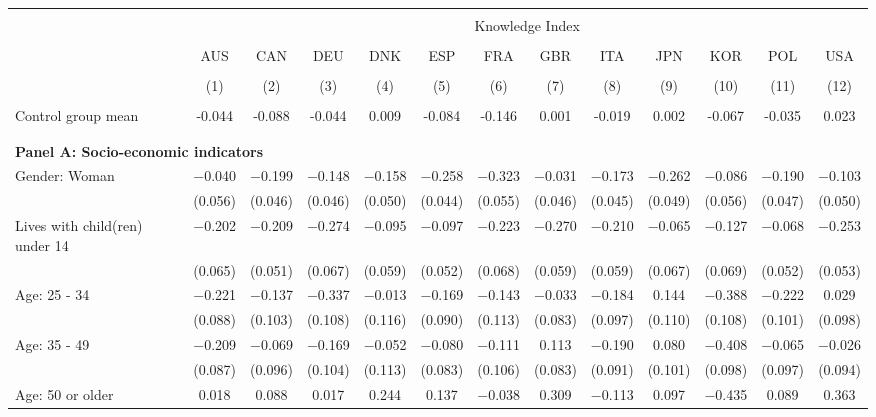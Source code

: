 
\begin{tabular}{@{\extracolsep{5pt}}lcccccccccccc} 
\\[-1.8ex]\hline 
\hline \\[-1.8ex] 
 & \multicolumn{12}{c}{Knowledge Index} \\ 
\cline{2-13} 
\\[-1.8ex] & AUS & CAN & DEU & DNK & ESP & FRA & GBR & ITA & JPN & KOR & POL & USA \\ 
\\[-1.8ex] & (1) & (2) & (3) & (4) & (5) & (6) & (7) & (8) & (9) & (10) & (11) & (12)\\ 
\hline \\[-1.8ex] 
Control group mean & -0.044 & -0.088 & -0.044 & 0.009 & -0.084 & -0.146 & 0.001 & -0.019 & 0.002 & -0.067 & -0.035 & 0.023   \\ \hline \\[-1.8ex]
\\[1ex]
\multicolumn{ 13 }{l}{\textbf{ Panel A: Socio-economic indicators }} \\
 Gender: Woman & $-$0.040 & $-$0.199 & $-$0.148 & $-$0.158 & $-$0.258 & $-$0.323 & $-$0.031 & $-$0.173 & $-$0.262 & $-$0.086 & $-$0.190 & $-$0.103 \\ 
  & (0.056) & (0.046) & (0.046) & (0.050) & (0.044) & (0.055) & (0.046) & (0.045) & (0.049) & (0.056) & (0.047) & (0.050) \\ 
  Lives with child(ren) under 14 & $-$0.202 & $-$0.209 & $-$0.274 & $-$0.095 & $-$0.097 & $-$0.223 & $-$0.270 & $-$0.210 & $-$0.065 & $-$0.127 & $-$0.068 & $-$0.253 \\ 
  & (0.065) & (0.051) & (0.067) & (0.059) & (0.052) & (0.068) & (0.059) & (0.059) & (0.067) & (0.069) & (0.052) & (0.053) \\ 
  Age: 25 - 34 & $-$0.221 & $-$0.137 & $-$0.337 & $-$0.013 & $-$0.169 & $-$0.143 & $-$0.033 & $-$0.184 & 0.144 & $-$0.388 & $-$0.222 & 0.029 \\ 
  & (0.088) & (0.103) & (0.108) & (0.116) & (0.090) & (0.113) & (0.083) & (0.097) & (0.110) & (0.108) & (0.101) & (0.098) \\ 
  Age: 35 - 49 & $-$0.209 & $-$0.069 & $-$0.169 & $-$0.052 & $-$0.080 & $-$0.111 & 0.113 & $-$0.190 & 0.080 & $-$0.408 & $-$0.065 & $-$0.026 \\ 
  & (0.087) & (0.096) & (0.104) & (0.113) & (0.083) & (0.106) & (0.083) & (0.091) & (0.101) & (0.098) & (0.097) & (0.094) \\ 
  Age: 50 or older & 0.018 & 0.088 & 0.017 & 0.244 & 0.137 & $-$0.038 & 0.309 & $-$0.113 & 0.097 & $-$0.435 & 0.089 & 0.363 \\ 

\end{tabular}
